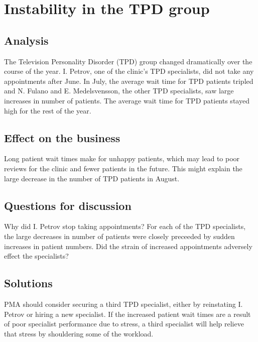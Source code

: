 \section{Instability in the TPD group}

\subsection{Analysis}
The Television Personality Disorder (TPD) group changed dramatically over the course of the year. I. Petrov, one of the clinic's TPD specialists, did not take any appointments after June. In July, the average wait time for TPD patients tripled and N. Fulano and E. Medelsvensson, the other TPD specialists, saw large increases in number of patients. The average wait time for TPD patients stayed high for the rest of the year.

\begin{figure}[h]
\centering
{}
\label{apmd}
\end{figure}

\begin{figure}[h]
\centering
{}
\label{dpmc}
\end{figure}

\subsection{Effect on the business}

Long patient wait times make for unhappy patients, which may lead to poor reviews for the clinic and fewer patients in the future. This might explain the large decrease in the number of TPD patients in August.

\begin{comment}
\begin{figure}[h]
\centering
\makebox[\textwidth][c]{\texttt{[image: plots/appts\_per\_month\_cond]}}
\label{apmc}
\end{figure}
\end{comment}

\subsection{Questions for discussion}
Why did I. Petrov stop taking appointments? For each of the TPD specialists, the large decreases in number of patients were closely preceeded by sudden increases in patient numbers. Did the strain of increased appointments adversely effect the specialists?

\subsection{Solutions}
PMA should consider securing a third TPD specialist, either by reinstating I. Petrov or hiring a new specialist. If the increased patient wait times are a result of poor specialist performance due to stress, a third specialist will help relieve that stress by shouldering some of the workload.
